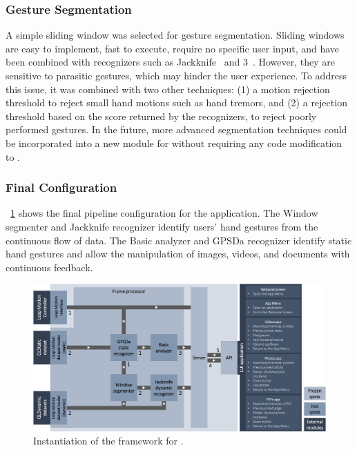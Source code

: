 \subsubsection{Gesture Segmentation}
A simple sliding window was selected for gesture segmentation. Sliding windows are easy to implement, fast to execute, require no specific user input, and have been combined with recognizers such as Jackknife~\cite{Taranta:2017} and 3\textcent~\cite{Caputo:2019}. However, they are sensitive to parasitic gestures, which may hinder the user experience. To address this issue, it was combined with two other techniques: (1) a motion rejection threshold to reject small hand motions such as hand tremors, and (2) a rejection threshold based on the score returned by the recognizers, to reject poorly performed gestures. In the future, more advanced segmentation techniques \cite{Kratz:2015,Chen:2016,Taranta:2021} could be incorporated into a new module for \ql without requiring any code modification to \lui.

\subsubsection{Final Configuration}
\fig~\ref{fig:lui:quantumleap} shows the final \ql pipeline configuration for the \lui application. The Window segmenter and Jackknife recognizer identify users' hand gestures from the continuous flow of data. The Basic analyzer and GPSDa recognizer identify static hand gestures and allow the manipulation of images, videos, and documents with continuous feedback.

\begin{figure}[!b]
    \centering
    \includegraphics[width=\linewidth]{Figures/LUI/Architecture/quantumleap-lui.pdf}
    \vspace{-16pt}
    \caption{Instantiation of the \ql framework for \lui.}
    \label{fig:lui:quantumleap}
\end{figure}

